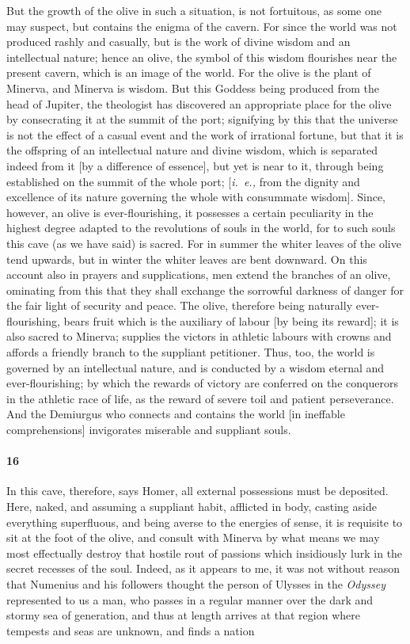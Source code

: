 \documentclass[a4paper,12pt]{article}
\begin{document}
\noindent But the growth of the olive in such a situation, is not fortuitous,
as some one may suspect, but contains the enigma of the cavern. For since the
world was not produced rashly and casually, but is the work of divine wisdom
and an intellectual nature; hence an olive, the symbol of this wisdom
flourishes near the present cavern, which is an image of the world. For the
olive is the plant of Minerva, and Minerva is wisdom. But this Goddess being
produced from the head of Jupiter, the theologist has discovered an appropriate
place for the olive by consecrating it at the summit of the port; signifying by
this that the universe is not the effect of a casual event and the work of
irrational fortune, but that it is the offspring of an intellectual nature and
divine wisdom, which is separated indeed from it [by a difference of essence],
but yet is near to it, through being established on the summit of the whole
port; [\textit{i.~e.,} from the dignity and excellence of its nature governing
the whole with consummate wisdom]. Since, however, an olive is
ever-flourishing, it possesses a certain peculiarity in the highest degree
adapted to the revolutions of souls in the world, for to such souls this cave
(as we have said) is sacred. For in summer the whiter leaves of the olive tend
upwards, but in winter the whiter leaves are bent downward. On this account
also in prayers and supplications, men extend the branches of an olive,
ominating from this that they shall exchange the sorrowful darkness of danger
for the fair light of security and peace. The olive, therefore being naturally
ever-flourishing, bears fruit which is the auxiliary of labour [by being its
reward]; it is also sacred to Minerva; supplies the victors in athletic labours
with crowns and affords a friendly branch to the suppliant petitioner. Thus,
too, the world is governed by an intellectual nature, and is conducted by a
wisdom eternal and ever-flourishing; by which the rewards of victory are
conferred on the conquerors in the athletic race of life, as the reward of
severe toil and patient perseverance. And the Demiurgus who connects and
contains the world [in ineffable comprehensions] invigorates miserable and
suppliant souls.


\paragraph{16} In this cave, therefore, says Homer, all external possessions
must be deposited. Here, naked, and assuming a suppliant habit, afflicted in
body, casting aside everything superfluous, and being averse to the energies of
sense, it is requisite to sit at the foot of the olive, and consult with
Minerva by what means we may most effectually destroy that hostile rout of
passions which insidiously lurk in the secret recesses of the soul. Indeed, as
it appears to me, it was not without reason that Numenius and his followers
thought the person of Ulysses in the \textit{Odyssey} represented to us a man,
who passes in a regular manner over the dark and stormy sea of generation, and
thus at length arrives at that region where tempests and seas are unknown, and
finds a nation
\end{document}
